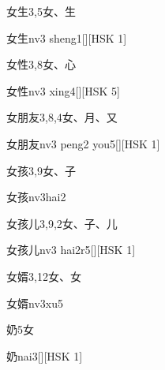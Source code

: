 \begin{Entry}{女生}{3,5}{⼥、⽣}
  \begin{Phonetics}{女生}{nv3 sheng1}[][HSK 1]
  \end{Phonetics}
\end{Entry}

\begin{Entry}{女性}{3,8}{⼥、⼼}
  \begin{Phonetics}{女性}{nv3 xing4}[][HSK 5]
  \end{Phonetics}
\end{Entry}

\begin{Entry}{女朋友}{3,8,4}{⼥、⽉、⼜}
  \begin{Phonetics}{女朋友}{nv3 peng2 you5}[][HSK 1]
  \end{Phonetics}
\end{Entry}

\begin{Entry}{女孩}{3,9}{⼥、⼦}
  \begin{Phonetics}{女孩}{nv3hai2}
  \end{Phonetics}
\end{Entry}

\begin{Entry}{女孩儿}{3,9,2}{⼥、⼦、⼉}
  \begin{Phonetics}{女孩儿}{nv3 hai2r5}[][HSK 1]
  \end{Phonetics}
\end{Entry}

\begin{Entry}{女婿}{3,12}{⼥、⼥}
  \begin{Phonetics}{女婿}{nv3xu5}
  \end{Phonetics}
\end{Entry}

\begin{Entry}{奶}{5}{⼥}
  \begin{Phonetics}{奶}{nai3}[][HSK 1]
  \end{Phonetics}
\end{Entry}

